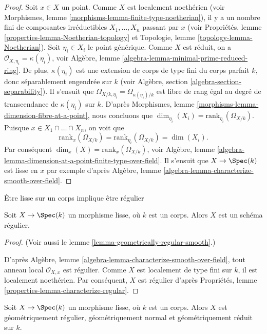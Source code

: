 \begin{proof}
 Soit $x \in X$ un point. Comme $X$ est localement noethérien (voir
Morphismes, lemme \ref{morphisms-lemma-finite-type-noetherian}),
il y a un nombre fini de composantes irréductibles 
$X_1, \ldots, X_n$ passant par $x$ (voir
Propriétés, lemme \ref{properties-lemma-Noetherian-topology} et
Topologie, lemme \ref{topology-lemma-Noetherian}).
Soit $\eta_i \in X_i$ le point générique. Comme $X$ est réduit, on a 
$\mathcal{O}_{X, \eta_i} = \kappa(\eta_i)$,
voir Algèbre, lemme \ref{algebra-lemma-minimal-prime-reduced-ring}.
De plus, $\kappa(\eta_i)$ est une extension de corps de type
fini du corps parfait $k$, donc séparablement engendrée sur $k$ (voir
Algèbre, section \ref{algebra-section-separability}).
Il s'ensuit que $\Omega_{X/k, \eta_i} = \Omega_{\kappa(\eta_i)/k}$
 est libre de rang égal au degré de transcendance de $\kappa(\eta_i)$ sur $k$.
D'après Morphismes, lemme \ref{morphisms-lemma-dimension-fibre-at-a-point},
nous concluons que $\dim_{\eta_i}(X_i) = \text{rank}_{\eta_i}(\Omega_{X/k})$.
Puisque $x \in X_1 \cap \ldots \cap X_n$, on voit que 
$$
\text{rank}_x(\Omega_{X/k}) = \text{rank}_{\eta_i}(\Omega_{X/k}) = \dim(X_i).
$$
 Par conséquent $\dim_x(X) = \text{rank}_x(\Omega_{X/k})$,
voir Algèbre, lemme \ref{algebra-lemma-dimension-at-a-point-finite-type-over-field}.
Il s'ensuit que $X \to \Spec(k)$ est lisse en $x$ par exemple
d'après Algèbre, lemme \ref{algebra-lemma-characterize-smooth-over-field}. 
\end{proof}

\begin{lemma}
\label{lemma-smooth-regular}
\begin{slogan}
 Être lisse sur un corps implique être régulier 
\end{slogan}
 Soit $X \to \Spec(k)$ un morphisme lisse, où $k$ est un corps.
Alors $X$ est un schéma régulier. 
\end{lemma}

\begin{proof}
 (Voir aussi
le lemme \ref{lemma-geometrically-regular-smooth}.)

D'après Algèbre, lemme \ref{algebra-lemma-characterize-smooth-over-field},
tout anneau local $\mathcal{O}_{X, x}$ est régulier.
Comme $X$ est localement de type fini sur $k$, il est
localement noethérien. Par conséquent, $X$ est régulier
d'après Propriétés, lemme \ref{properties-lemma-characterize-regular}. 
\end{proof}

\begin{lemma}
\label{lemma-smooth-geometrically-normal}
 Soit $X \to \Spec(k)$ un morphisme lisse, où $k$ est un corps.
Alors $X$ est géométriquement régulier, géométriquement normal et
géométriquement réduit sur $k$. 
\end{lemma}

